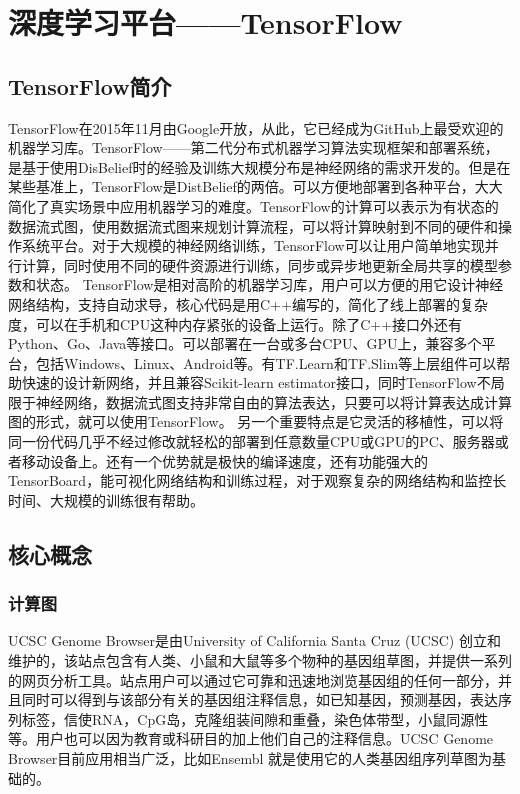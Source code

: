 \chapter{深度学习平台——TensorFlow}
	\section{TensorFlow简介}
	TensorFlow在2015年11月由Google开放，从此，它已经成为GitHub上最受欢迎的机器学习库。TensorFlow——第二代分布式机器学习算法实现框架和部署系统，是基于使用DisBelief时的经验及训练大规模分布是神经网络的需求开发的。但是在某些基准上，TensorFlow是DistBelief的两倍。可以方便地部署到各种平台，大大简化了真实场景中应用机器学习的难度。TensorFlow的计算可以表示为有状态的数据流式图，使用数据流式图来规划计算流程，可以将计算映射到不同的硬件和操作系统平台。对于大规模的神经网络训练，TensorFlow可以让用户简单地实现并行计算，同时使用不同的硬件资源进行训练，同步或异步地更新全局共享的模型参数和状态。
	TensorFlow是相对高阶的机器学习库，用户可以方便的用它设计神经网络结构，支持自动求导，核心代码是用C++编写的，简化了线上部署的复杂度，可以在手机和CPU这种内存紧张的设备上运行。除了C++接口外还有Python、Go、Java等接口。可以部署在一台或多台CPU、GPU上，兼容多个平台，包括Windows、Linux、Android等。有TF.Learn和TF.Slim等上层组件可以帮助快速的设计新网络，并且兼容Scikit-learn estimator接口，同时TensorFlow不局限于神经网络，数据流式图支持非常自由的算法表达，只要可以将计算表达成计算图的形式，就可以使用TensorFlow。
	另一个重要特点是它灵活的移植性，可以将同一份代码几乎不经过修改就轻松的部署到任意数量CPU或GPU的PC、服务器或者移动设备上。还有一个优势就是极快的编译速度，还有功能强大的TensorBoard，能可视化网络结构和训练过程，对于观察复杂的网络结构和监控长时间、大规模的训练很有帮助。
		\section{核心概念}
		\subsection{计算图}
		UCSC Genome Browser是由University of California Santa Cruz (UCSC) 创立和维护的，该站点包含有人类、小鼠和大鼠等多个物种的基因组草图，并提供一系列的网页分析工具。站点用户可以通过它可靠和迅速地浏览基因组的任何一部分，并且同时可以得到与该部分有关的基因组注释信息，如已知基因，预测基因，表达序列标签，信使RNA，CpG岛，克隆组装间隙和重叠，染色体带型，小鼠同源性等。用户也可以因为教育或科研目的加上他们自己的注释信息。UCSC Genome Browser目前应用相当广泛，比如Ensembl 就是使用它的人类基因组序列草图为基础的。

